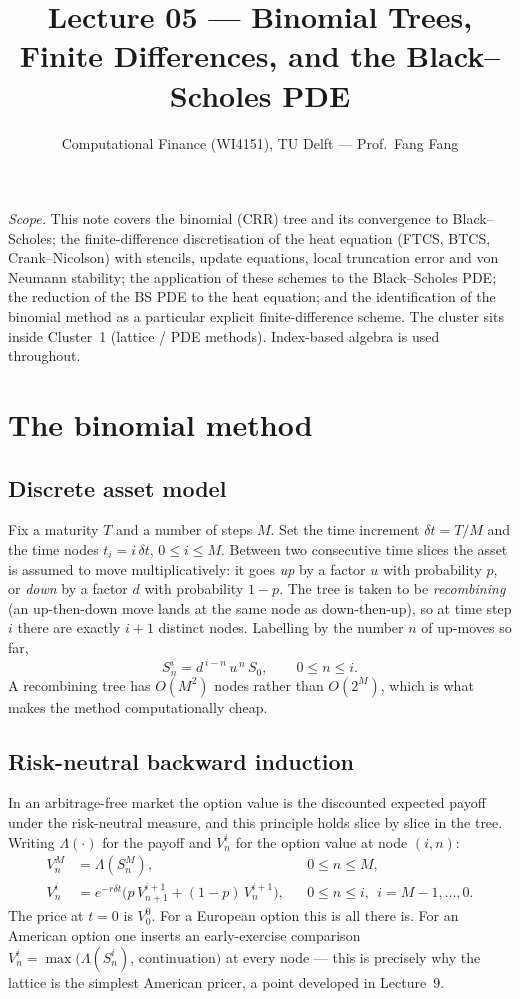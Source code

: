 \documentclass[11pt]{article}
\title{Lecture 05 --- Binomial Trees, Finite Differences, and the Black--Scholes PDE}
\author{Computational Finance (WI4151), TU Delft --- Prof.\ Fang Fang}
\date{}
\begin{document}
\maketitle

\noindent\emph{Scope.} This note covers the binomial (CRR) tree and its convergence to Black--Scholes; the finite-difference discretisation of the heat equation (FTCS, BTCS, Crank--Nicolson) with stencils, update equations, local truncation error and von Neumann stability; the application of these schemes to the Black--Scholes PDE; the reduction of the BS PDE to the heat equation; and the identification of the binomial method as a particular explicit finite-difference scheme. The cluster sits inside Cluster~1 (lattice / PDE methods). Index-based algebra is used throughout.

\tableofcontents

\section{The binomial method}

\subsection{Discrete asset model}
Fix a maturity $T$ and a number of steps $M$. Set the time increment $\delta t = T/M$ and the time nodes $t_i = i\,\delta t$, $0\le i\le M$. Between two consecutive time slices the asset is assumed to move multiplicatively: it goes \emph{up} by a factor $u$ with probability $p$, or \emph{down} by a factor $d$ with probability $1-p$. The tree is taken to be \emph{recombining} (an up-then-down move lands at the same node as down-then-up), so at time step $i$ there are exactly $i+1$ distinct nodes. Labelling by the number $n$ of up-moves so far,
\begin{equation}
S^i_n = d^{\,i-n}\,u^{\,n}\,S_0,\qquad 0\le n\le i.
\label{eq:nodeprice}
\end{equation}
A recombining tree has $O(M^2)$ nodes rather than $O(2^M)$, which is what makes the method computationally cheap.

\subsection{Risk-neutral backward induction}
In an arbitrage-free market the option value is the discounted expected payoff under the risk-neutral measure, and this principle holds slice by slice in the tree. Writing $\Lambda(\cdot)$ for the payoff and $V^i_n$ for the option value at node $(i,n)$:
\begin{align}
V^M_n &= \Lambda\!\left(S^M_n\right), && 0\le n\le M, \label{eq:treeinit}\\
V^i_n &= e^{-r\delta t}\Big( p\,V^{i+1}_{n+1} + (1-p)\,V^{i+1}_{n}\Big), && 0\le n\le i,\ \ i=M-1,\dots,0. \label{eq:treerec}
\end{align}
The price at $t=0$ is $V^0_0$. For a European option this is all there is. For an American option one inserts an early-exercise comparison $V^i_n = \max\!\big(\Lambda(S^i_n),\,\text{continuation}\big)$ at every node --- this is precisely why the lattice is the simplest American pricer, a point developed in Lecture~9.
\end{document}
